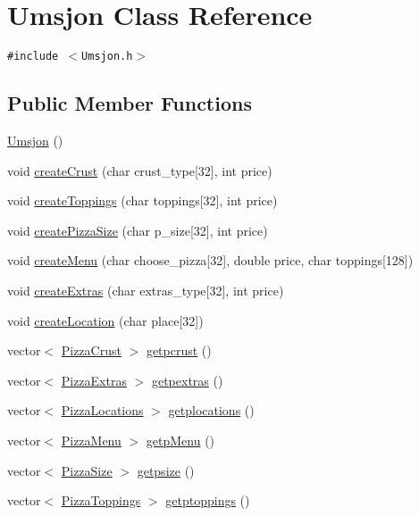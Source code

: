 \hypertarget{class_umsjon}{
\section{Umsjon Class Reference}
\label{class_umsjon}
}
{\tt \#include $<$Umsjon.h$>$}

\subsection*{Public Member Functions}
\begin{CompactItemize}
\item 
\hyperlink{class_umsjon_1f89bef332176cd139fa5f900d4735b6}{Umsjon} ()
\item 
void \hyperlink{class_umsjon_75c9c243db5456ca368b8cdc6f617603}{create\-Crust} (char crust\_\-type\mbox{[}32\mbox{]}, int price)
\item 
void \hyperlink{class_umsjon_b4c5d68540dc069a5871e57482a44454}{create\-Toppings} (char toppings\mbox{[}32\mbox{]}, int price)
\item 
void \hyperlink{class_umsjon_9b94d4f7ba3bbc2c46cc7bdce8f09d61}{create\-Pizza\-Size} (char p\_\-size\mbox{[}32\mbox{]}, int price)
\item 
void \hyperlink{class_umsjon_ce183afe9e7ad9a7492ac2241e2481e5}{create\-Menu} (char choose\_\-pizza\mbox{[}32\mbox{]}, double price, char toppings\mbox{[}128\mbox{]})
\item 
void \hyperlink{class_umsjon_b3b4384d1b6159cee7aab19dc1ff23eb}{create\-Extras} (char extras\_\-type\mbox{[}32\mbox{]}, int price)
\item 
void \hyperlink{class_umsjon_6827be731c8d50370297264676be442f}{create\-Location} (char place\mbox{[}32\mbox{]})
\item 
vector$<$ \hyperlink{class_pizza_crust}{Pizza\-Crust} $>$ \hyperlink{class_umsjon_1ba4091781dbf5acfd11d9bbd3c476c1}{getpcrust} ()
\item 
vector$<$ \hyperlink{class_pizza_extras}{Pizza\-Extras} $>$ \hyperlink{class_umsjon_48a5a2fa53cb3c40c681bd053598876b}{getpextras} ()
\item 
vector$<$ \hyperlink{class_pizza_locations}{Pizza\-Locations} $>$ \hyperlink{class_umsjon_a84f9abb849190a11dfcb3f0d5d619cc}{getplocations} ()
\item 
vector$<$ \hyperlink{class_pizza_menu}{Pizza\-Menu} $>$ \hyperlink{class_umsjon_729f51349769ff866a7cf5d79d381c2b}{getp\-Menu} ()
\item 
vector$<$ \hyperlink{class_pizza_size}{Pizza\-Size} $>$ \hyperlink{class_umsjon_fffa683bcf55b44d751ab146b21b3ae9}{getpsize} ()
\item 
vector$<$ \hyperlink{class_pizza_toppings}{Pizza\-Toppings} $>$ \hyperlink{class_umsjon_63e370dface20065bb6dde6d38ea4287}{getptoppings} ()
\end{CompactItemize}


